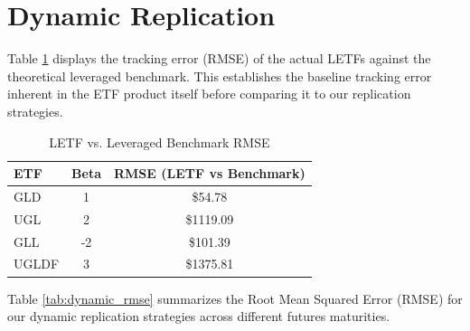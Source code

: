 \documentclass{article}
\begin{document}

\section{Dynamic Replication}

Table \ref{tab:letf_benchmark_rmse} displays the tracking error (RMSE) of the actual LETFs against the theoretical leveraged benchmark. This establishes the baseline tracking error inherent in the ETF product itself before comparing it to our replication strategies.

\begin{table}[h!]
\centering
\caption{LETF vs. Leveraged Benchmark RMSE}
\label{tab:letf_benchmark_rmse}
\begin{tabular}{lcc}
\toprule
\textbf{ETF} & \textbf{Beta} & \textbf{RMSE (LETF vs Benchmark)} \\
\midrule
GLD   & 1  & \$54.78 \\
UGL   & 2  & \$1119.09 \\
GLL   & -2 & \$101.39 \\
UGLDF & 3  & \$1375.81 \\
\bottomrule
\end{tabular}
\end{table}

Table \ref{tab:dynamic_rmse} summarizes the Root Mean Squared Error (RMSE) for our dynamic replication strategies across different futures maturities.
\end{document}

